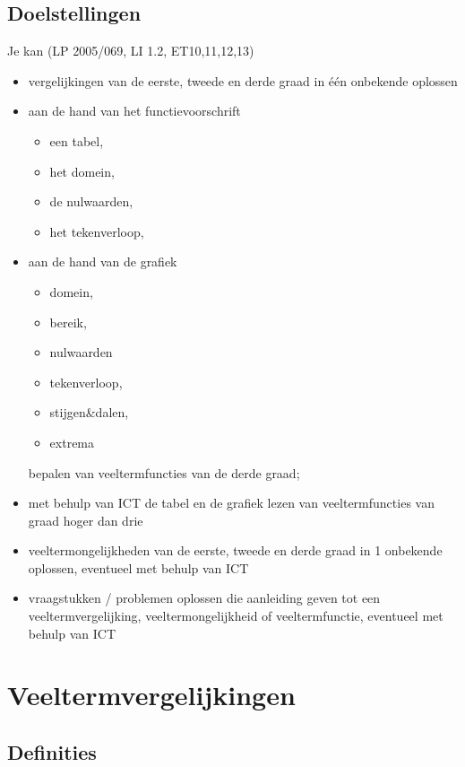 \documentclass[12pt,twoside,a4paper]{article}
\begin{document}
\subsection*{Doelstellingen}
{\singlespacing
  Je kan \hfill  {\scriptsize(LP 2005/069, LI 1.2, ET10,11,12,13)}
  \begin{itemize}
  \item vergelijkingen van de eerste, tweede en derde graad in één onbekende oplossen
  \item aan de hand van het functievoorschrift
    \begin{itemize}
    \item een tabel,
    \item het domein,
    \item de nulwaarden,
    \item het tekenverloop,
    \end{itemize}
  \item aan de hand van de grafiek
    \begin{itemize}
    \item domein,
    \item bereik,
    \item nulwaarden
    \item tekenverloop,
    \item stijgen\&dalen,
    \item extrema
    \end{itemize}
    bepalen van veeltermfuncties van de derde graad;
  \item met behulp van ICT de tabel en de grafiek lezen van veeltermfuncties van graad hoger dan drie
  \item veeltermongelijkheden van de eerste, tweede en derde graad in 1 onbekende oplossen, eventueel met behulp van ICT
  \item vraagstukken / problemen oplossen die aanleiding geven tot een veeltermvergelijking, veeltermongelijkheid of veeltermfunctie, eventueel met behulp van ICT
  \end{itemize}
}

\newpage
\thispagestyle{empty}
\tableofcontents


\newpage
{}

\section{Veeltermvergelijkingen}

\subsection{Definities}
\end{document}
